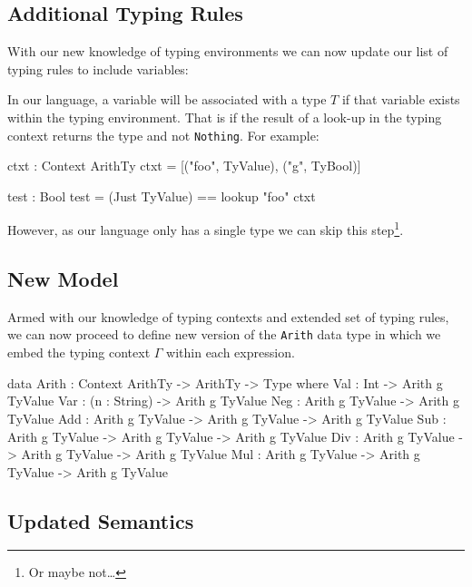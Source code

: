 \subsection{Additional Typing Rules}
\label{sec:typed-arith-var:typing-rules}

With our new knowledge of typing environments we can now update our list of typing rules to include variables:

\begin{prooftree}
\end{prooftree}

\noindent
In our language, a variable will be associated with a type $T$ if that variable exists within the typing environment.
That is if the result of a look-up in the typing context returns the type and not \texttt{Nothing}.
For example:

\begin{code}
ctxt : Context ArithTy
ctxt = [("foo", TyValue), ("g", TyBool)]

test : Bool
test = (Just TyValue) == lookup "foo" ctxt
\end{code}

\noindent
However, as our language only has a single type we can skip this step\footnote{Or maybe not\ldots}.

\subsection{New Model}
\label{sec:typed-arith-var:model}

Armed with our knowledge of typing contexts and extended set of typing rules, we can now proceed to define new version of the \texttt{Arith} data type in which we embed the typing context $\Gamma$ within each expression.

\begin{code}
data Arith : Context ArithTy -> ArithTy -> Type where
  Val : Int                                -> Arith g TyValue
  Var : (n : String)                       -> Arith g TyValue
  Neg : Arith g TyValue                    -> Arith g TyValue
  Add : Arith g TyValue -> Arith g TyValue -> Arith g TyValue
  Sub : Arith g TyValue -> Arith g TyValue -> Arith g TyValue
  Div : Arith g TyValue -> Arith g TyValue -> Arith g TyValue
  Mul : Arith g TyValue -> Arith g TyValue -> Arith g TyValue
\end{code}

\subsection{Updated Semantics}
\label{sec:typed-arith-var:semantics}

